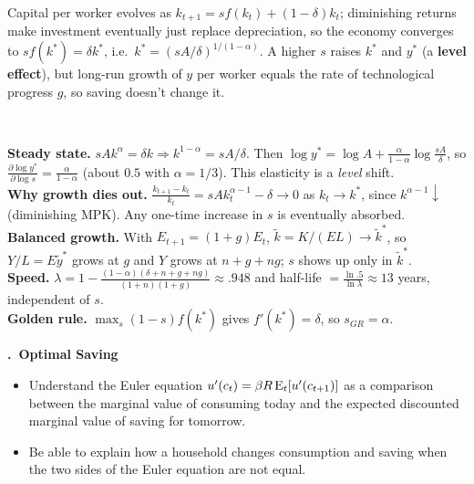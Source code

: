 \documentclass[11pt]{article}
\newcounter{qn}
\newcommand{\question}[1]{\par\needspace{14\baselineskip}\refstepcounter{qn}\medskip
{\bfseries\color{ink}\large \theqn.\ #1}\par\smallskip}
\begin{document}
\begin{resp}
\begin{minipage}[t]{0.62\textwidth}\vspace{0pt}
Capital per worker evolves as $k_{t+1}=sf(k_t)+(1-\delta)k_t$; diminishing returns make investment eventually just replace depreciation, so the economy converges to $sf(k^*)=\delta k^*$, i.e.\ $k^*=(sA/\delta)^{1/(1-\alpha)}$. A higher $s$ raises $k^*$ and $y^*$ (a \textbf{level effect}), but long-run growth of $y$ per worker equals the rate of technological progress $g$, so saving doesn't change it.
\end{minipage}\hfill
\begin{minipage}[t]{0.34\textwidth}\vspace{0pt}\centering
\scalebox{0.7}{\figSolow}\\[2pt]
\scalebox{0.7}{\figLevelGrowth}
\end{minipage}
\end{resp}
\begin{intu}
\textbf{Steady state.} $sA k^{\alpha}=\delta k\Rightarrow k^{1-\alpha}=sA/\delta$. Then $\log y^*=\log A+\frac{\alpha}{1-\alpha}\log\frac{sA}{\delta}$, so $\frac{\partial\log y^*}{\partial\log s}=\frac{\alpha}{1-\alpha}$ (about $0.5$ with $\alpha=1/3$). This elasticity is a \emph{level} shift.\\
\textbf{Why growth dies out.} $\frac{k_{t+1}-k_t}{k_t}=sAk_t^{\alpha-1}-\delta\to0$ as $k_t\to k^*$, since $k^{\alpha-1}\downarrow$ (diminishing MPK). Any one-time increase in $s$ is eventually absorbed.\\
\textbf{Balanced growth.} With $E_{t+1}=(1+g)E_t$, $\tilde k=K/(EL)\to\tilde k^*$, so $Y/L=E\tilde y^*$ grows at $g$ and $Y$ grows at $n+g+ng$; $s$ shows up only in $\tilde k^*$.\\
\textbf{Speed.} $\lambda=1-\frac{(1-\alpha)(\delta+n+g+ng)}{(1+n)(1+g)}\approx.948$ and half-life $=\frac{\ln .5}{\ln\lambda}\approx13$ years, independent of $s$.\\
\textbf{Golden rule.} $\max_s(1-s)f(k^*)$ gives $f'(k^*)=\delta$, so $s_{GR}=\alpha$.
\end{intu}

\question{Optimal Saving}
\begin{itemize}[leftmargin=1.2em,itemsep=0pt]\itshape
\item Understand the Euler equation $u'(c_t)=\beta R\,\mathrm{E}_t[u'(c_{t+1})]$ as a comparison between the marginal value of consuming today and the expected discounted marginal value of saving for tomorrow.
\item Be able to explain how a household changes consumption and saving when the two sides of the Euler equation are not equal.
\end{itemize}
\end{document}
